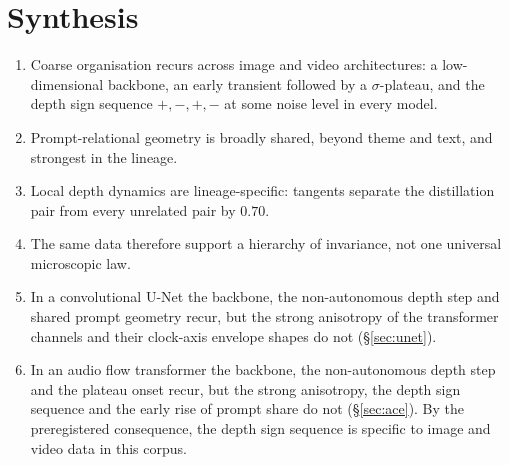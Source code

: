 \documentclass[11pt]{article}
\begin{document}
\section{Synthesis}\label{sec:synthesis}
\begin{enumerate}
 \item Coarse organisation recurs across image and video architectures: a low-dimensional backbone, an early transient followed by a $\sigma$-plateau, and the depth sign sequence $+,-,+,-$ at some noise level in every model.
 \item Prompt-relational geometry is broadly shared, beyond theme and text, and strongest in the lineage.
 \item Local depth dynamics are lineage-specific: tangents separate the distillation pair from every unrelated pair by $0.70$.
 \item The same data therefore support a hierarchy of invariance, not one universal microscopic law.
 \item In a convolutional U-Net the backbone, the non-autonomous depth step and shared prompt geometry recur, but the strong anisotropy of the transformer channels and their clock-axis envelope shapes do not (\S\ref{sec:unet}).
 \item In an audio flow transformer the backbone, the non-autonomous depth step and the plateau onset recur, but the strong anisotropy, the depth sign sequence and the early rise of prompt share do not (\S\ref{sec:ace}). By the preregistered consequence, the depth sign sequence is specific to image and video data in this corpus.
\end{enumerate}

\end{document}
